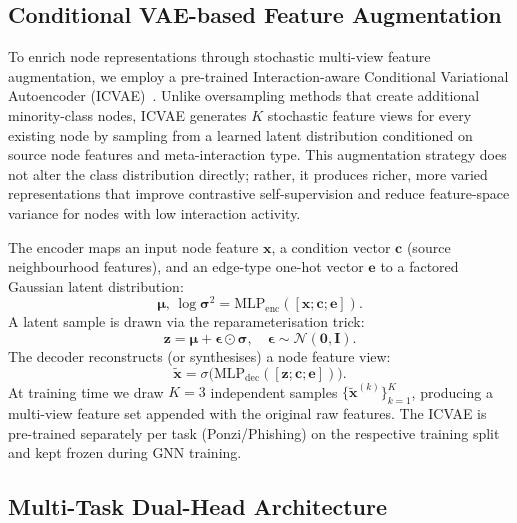 \documentclass[conference]{IEEEtran}
\begin{document}
\subsection{Conditional VAE-based Feature Augmentation}

To enrich node representations through stochastic multi-view feature
augmentation, we employ a pre-trained Interaction-aware Conditional
Variational Autoencoder (ICVAE)~\cite{li2022graphvae}.
Unlike oversampling methods that create additional minority-class
nodes, ICVAE generates $K$ stochastic feature views for every
existing node by sampling from a learned latent distribution
conditioned on source node features and meta-interaction type.
This augmentation strategy does not alter the class distribution
directly; rather, it produces richer, more varied representations
that improve contrastive self-supervision and reduce feature-space
variance for nodes with low interaction activity.

The encoder maps an input node feature $\mathbf{x}$, a condition
vector $\mathbf{c}$ (source neighbourhood features), and an edge-type
one-hot vector $\mathbf{e}$ to a factored Gaussian latent distribution:
\begin{equation}
  \boldsymbol{\mu},\,\log\boldsymbol{\sigma}^2
  = \mathrm{MLP}_{\mathrm{enc}}([\mathbf{x};\mathbf{c};\mathbf{e}]).
\end{equation}
A latent sample is drawn via the reparameterisation trick:
\begin{equation}
  \mathbf{z} = \boldsymbol{\mu} + \boldsymbol{\epsilon}\odot\boldsymbol{\sigma},
  \quad \boldsymbol{\epsilon}\sim\mathcal{N}(\mathbf{0},\mathbf{I}).
\end{equation}
The decoder reconstructs (or synthesises) a node feature view:
\begin{equation}
  \tilde{\mathbf{x}} = \sigma\!\bigl(\mathrm{MLP}_{\mathrm{dec}}([\mathbf{z};\mathbf{c};\mathbf{e}])\bigr).
\end{equation}
At training time we draw $K=3$ independent samples
$\{\tilde{\mathbf{x}}^{(k)}\}_{k=1}^{K}$, producing a multi-view
feature set appended with the original raw features.
The ICVAE is pre-trained separately per task (Ponzi/Phishing) on
the respective training split and kept frozen during GNN training.

\subsection{Multi-Task Dual-Head Architecture}
\label{sec:dualhead}
\end{document}
